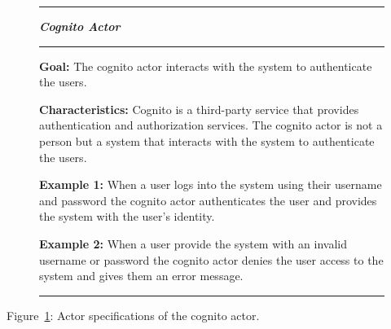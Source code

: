 \begin{figure}[H]
    \noindent
    \rule{\textwidth}{0.4pt}
    \begin{center}
        \noindent
        \textit{\textbf{Cognito Actor}}
    \end{center}

    \noindent
    \rule{\textwidth}{0.4pt}

    \noindent
    \textbf{Goal:} The cognito actor interacts with the system to authenticate the users.
    \newline

    \noindent
    \textbf{Characteristics:} Cognito is a third-party service that provides authentication and authorization services.
    The cognito actor is not a person but a system that interacts with the system to authenticate the users.
    \newline

    \noindent
    \textbf{Example 1:} When a user logs into the system using their username and password the cognito actor
    authenticates the user and provides the system with the user's identity.
    \newline

    \noindent
    \textbf{Example 2:} When a user provide the system with an invalid username or password the cognito actor
    denies the user access to the system and gives them an error message.

    \noindent
    \rule{\textwidth}{0.4pt}\label{fig:actor-cognito}
\end{figure}

Figure~\ref{fig:actor-cognito}: Actor specifications of the cognito actor.
